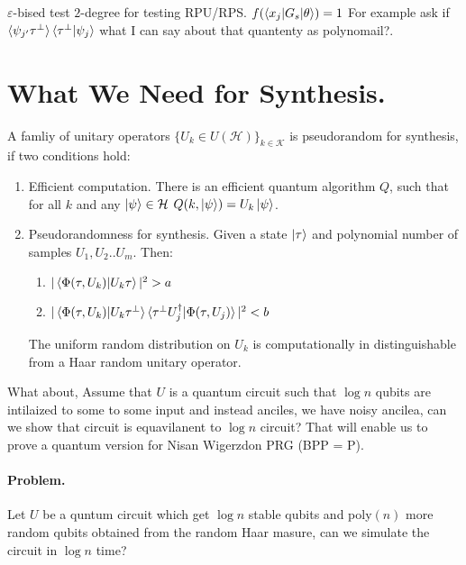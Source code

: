 \documentclass[manuscript,screen,review]{acmart}
\begin{document}
\begin{definition}
  $\varepsilon$-bised test $2$-degree for testing RPU/RPS.
  $f(\braket{x_{j}|G_{s}|\theta}) = 1$ For example ask if
  $\braket{\psi_{j^{\prime}}\tau^{\perp}}\braket{\tau^{\perp}|\psi_{j}}$ what I
  can say about that quantenty as polynomail?.
\end{definition}

\section{What We Need for Synthesis.}

\begin{definition} A famliy of unitary
  operators $\{ U_{k} \in U(\mathcal{H}) \}_{k \in \mathcal{K}}$ is pseudorandom
  for synthesis, if two conditions hold:
  \begin{enumerate}
    \item Efficient computation. There is an efficient quantum algorithm $Q$,
      such that for all $k$ and any $\ket{\psi} \in \mathcal{H}$
      $Q(k,\ket{\psi}) =
      U_{k}\ket{\psi}$.
    \item Pseudorandomness for synthesis. Given a state $\ket{\tau}$ and
      polynomial number of samples $U_{1},U_{2}..U_{m}$. Then:
      \begin{enumerate}
        \item $|\braket{\Phi(\tau,U_{k})|U_{k}\tau}|^{2} > a$
        \item
          $|\braket{\Phi(\tau,U_{k})|U_{k}\tau^{\perp}}\braket{\tau^{\perp}U^{\dagger}_{j}|\Phi(\tau,U_{j})}|^{2}
          < b$
      \end{enumerate}
      The uniform random distribution on $U_{k}$ is computationally in
      distinguishable from a Haar random unitary operator.
  \end{enumerate}
\end{definition}

What about, Assume that $U$ is a quantum circuit such that $\log n$ qubits are
intilaized to some to some input and instead anciles, we have noisy ancilea,
can we show that circuit is equavilanent to $\log n $ circuit? That will
enable us to prove a quantum version for Nisan Wigerzdon PRG (BPP = P).

\paragraph{Problem.} Let $U$ be a quntum circuit which get $\log n$ stable
qubits and poly$(n)$ more random qubits obtained from the random Haar masure,
can we simulate the circuit in $\log n$ time?
\end{document}
